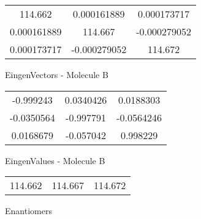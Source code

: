 \begin{multicols}{2}
\begin{center}
\begin{tabular}{|c c c|}
114.662	 & 	0.000161889	 & 	0.000173717	 \\
0.000161889	 & 	114.667	 & 	-0.000279052	 \\
0.000173717	 & 	-0.000279052	 & 	114.672
\end{tabular}

\vtab
 EingenVectors - Molecule B     \\
\vtab
\begin{tabular}{|c c c|}
-0.999243	 & 	0.0340426	 & 	0.0188303	 \\
-0.0350564	 & 	-0.997791	 & 	-0.0564246	 \\
0.0168679	 & 	-0.057042	 & 	0.998229
\end{tabular}

\vtab
 EingenValues - Molecule B     \\
\vtab
\begin{tabular}{|c c c|}
114.662	 & 	114.667	 & 	114.672	 \\
\end{tabular}

\end{center}
\end{multicols}
\begin{center}
\vtab
\vtab
\textcolor{NavyBlue}{\Large Enantiomers}
\end{center}

 \newpage

